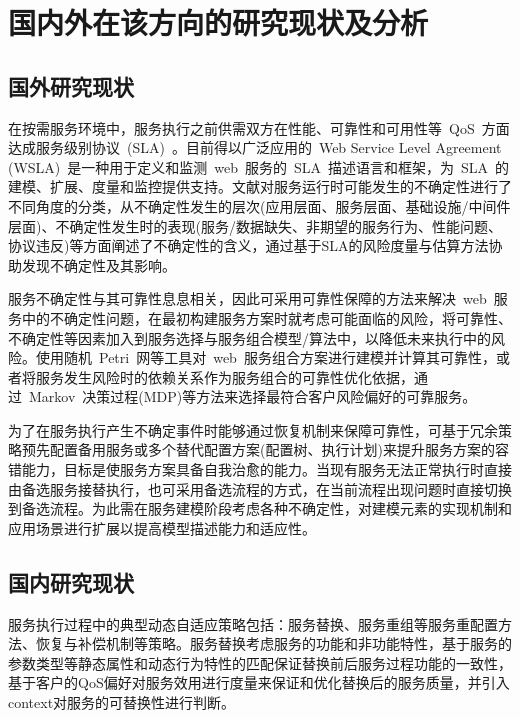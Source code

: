 \section{国内外在该方向的研究现状及分析}
\subsection{国外研究现状}
在按需服务环境中，服务执行之前供需双方在性能、可靠性和可用性等~QoS~方面达成服务级别协议~(SLA)~。目前得以广泛应用的~Web Service Level Agreement (WSLA)~是一种用于定义和监测~web~服务的~SLA~描述语言和框架，为~SLA~的建模、扩展、度量和监控提供支持。文献\cite{kokash2007evaluating}\cite{chan2009fault}\cite{ardagna2006faults}对服务运行时可能发生的不确定性进行了不同角度的分类，从不确定性发生的层次(应用层面、服务层面、基础设施/中间件层面)、不确定性发生时的表现(服务/数据缺失、非期望的服务行为、性能问题、协议违反)等方面阐述了不确定性的含义，通过基于SLA的风险度量与估算方法协助发现不确定性及其影响。

服务不确定性与其可靠性息息相关，因此可采用可靠性保障的方法来解决~web~服务中的不确定性问题，在最初构建服务方案时就考虑可能面临的风险，将可靠性、不确定性等因素加入到服务选择与服务组合模型/算法中，以降低未来执行中的风险。使用随机~Petri~网等工具对~web~服务组合方案进行建模并计算其可靠性，或者将服务发生风险时的依赖关系作为服务组合的可靠性优化依据，通过~Markov~决策过程(MDP)等方法来选择最符合客户风险偏好的可靠服务。

为了在服务执行产生不确定事件时能够通过恢复机制来保障可靠性，可基于冗余策略预先配置备用服务或多个替代配置方案(配置树、执行计划)来提升服务方案的容错能力，目标是使服务方案具备自我治愈的能力。当现有服务无法正常执行时直接由备选服务接替执行，也可采用备选流程的方式，在当前流程出现问题时直接切换到备选流程。为此需在服务建模阶段考虑各种不确定性，对建模元素的实现机制和应用场景进行扩展以提高模型描述能力和适应性。

\subsection{国内研究现状}

服务执行过程中的典型动态自适应策略包括：服务替换、服务重组等服务重配置方法、恢复与补偿机制等策略。服务替换考虑服务的功能和非功能特性，基于服务的参数类型等静态属性和动态行为特性的匹配保证替换前后服务过程功能的一致性，基于客户的QoS偏好对服务效用进行度量来保证和优化替换后的服务质量，并引入context对服务的可替换性进行判断。


